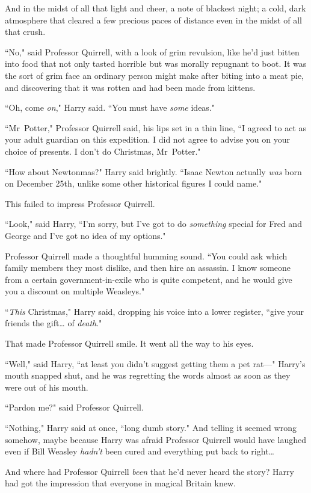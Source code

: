 And in the midst of all that light and cheer, a note of blackest night; a cold, dark atmosphere that cleared a few precious paces of distance even in the midst of all that crush.

``No," said Professor Quirrell, with a look of grim revulsion, like he'd just bitten into food that not only tasted horrible but was morally repugnant to boot. It was the sort of grim face an ordinary person might make after biting into a meat pie, and discovering that it was rotten and had been made from kittens.

``Oh, come \emph{on}," Harry said. ``You must have \emph{some} ideas."

``Mr~Potter," Professor Quirrell said, his lips set in a thin line, ``I agreed to act as your adult guardian on this expedition. I did not agree to advise you on your choice of presents. I don't do Christmas, Mr~Potter."

``How about Newtonmas?" Harry said brightly. ``Isaac Newton actually \emph{was} born on December 25th, unlike some other historical figures I could name."

This failed to impress Professor Quirrell.

``Look," said Harry, ``I'm sorry, but I've got to do \emph{something} special for Fred and George and I've got no idea of my options."

Professor Quirrell made a thoughtful humming sound. ``You could ask which family members they most dislike, and then hire an assassin. I know someone from a certain government-in-exile who is quite competent, and he would give you a discount on multiple Weasleys."

``\emph{This} Christmas," Harry said, dropping his voice into a lower register, ``give your friends the gift{\ldots} of \emph{death}."

That made Professor Quirrell smile. It went all the way to his eyes.

``Well," said Harry, ``at least you didn't suggest getting them a pet rat—" Harry's mouth snapped shut, and he was regretting the words almost as soon as they were out of his mouth.

``Pardon me?" said Professor Quirrell.

``Nothing," Harry said at once, ``long dumb story." And telling it seemed wrong somehow, maybe because Harry was afraid Professor Quirrell would have laughed even if Bill Weasley \emph{hadn't} been cured and everything put back to right{\ldots}

And where had Professor Quirrell \emph{been} that he'd never heard the story? Harry had got the impression that everyone in magical Britain knew.

